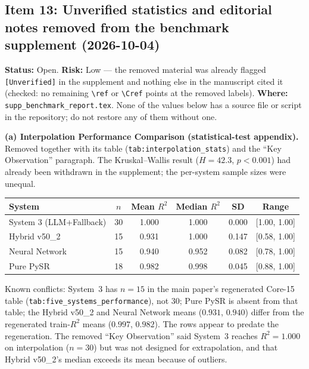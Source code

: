 \documentclass[11pt]{article}
\newcommand{\Rsq}{R^{2}}
\begin{document}
\subsection*{Item 13: Unverified statistics and editorial notes removed from the benchmark supplement (2026-10-04)}
\textbf{Status:} Open. \textbf{Risk:} Low --- the removed material was already flagged
\texttt{[Unverified]} in the supplement and nothing else in the manuscript cited it (checked: no remaining
\texttt{\textbackslash ref} or \texttt{\textbackslash Cref} points at the removed labels).
\textbf{Where:} \texttt{supp\_benchmark\_report.tex}. None of the values below has a source file or script in the
repository; do not restore any of them without one.

\textbf{(a) Interpolation Performance Comparison (statistical-test appendix).} Removed together with its table
(\texttt{tab:interpolation\_stats}) and the ``Key Observation'' paragraph. The Kruskal--Wallis result
($H=42.3$, $p<0.001$) had already been withdrawn in the supplement; the per-system sample sizes were unequal.
\begin{center}\small
\begin{tabular}{lccccc}
\toprule
System & $n$ & Mean $\Rsq$ & Median $\Rsq$ & SD & Range \\
\midrule
System 3 (LLM+Fallback) & 30 & 1.000 & 1.000 & 0.000 & [1.00, 1.00] \\
Hybrid v50\_2 & 15 & 0.931 & 1.000 & 0.147 & [0.58, 1.00] \\
Neural Network & 15 & 0.940 & 0.952 & 0.082 & [0.78, 1.00] \\
Pure PySR & 18 & 0.982 & 0.998 & 0.045 & [0.88, 1.00] \\
\bottomrule
\end{tabular}
\end{center}
Known conflicts: System~3 has $n=15$ in the main paper's regenerated Core-15 table
(\texttt{tab:five\_systems\_performance}), not 30; Pure PySR is absent from that table; the Hybrid v50\_2 and Neural Network
means ($0.931$, $0.940$) differ from the regenerated train-$\Rsq$ means ($0.997$, $0.982$). The rows appear to predate the
regeneration. The removed ``Key Observation'' said System~3 reaches $\Rsq=1.000$ on interpolation ($n=30$) but was not
designed for extrapolation, and that Hybrid v50\_2's median exceeds its mean because of outliers.
\end{document}
